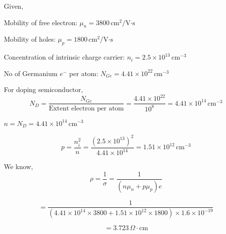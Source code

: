\documentclass[a4aper,12pt]{report}
\begin{document}
\begin{tcolorbox}[breakable, title = {\textbf{Question 1.1: }In a germanium sample, a donor type impurity is added to the extent of 1 atom per $10^8$ germanium atoms. Show that resistivity of the germanium sample drops to 3.7 ohm-cm  \\ 
    Given, 
    \begin{adjustwidth}{1cm}{5pt}
        \begin{tabular}{ll}
            $\mu_n=3800cm^2/V.s$ & \hspace*{20pt}$n_i = 2.5\times 10^{13}/cm^3$ \\
            $\mu_p = 1800cm^2/V.s$ &\hspace*{16pt} $N_{ge}=4.41 \times 10^{22}/cm^3$ 
        \end{tabular}
    \end{adjustwidth} }]
    Given,\\
    \begin{adjustwidth}{1cm}{3pt}
Mobility of free electron: $\mu_n=3800\,\text{cm}^2/\text{V·s}$ \par
Mobility of holes: $\mu_p=1800\,\text{cm}^2/\text{V·s}$ \par
Concentration of intrinsic charge carrier: $n_i=2.5\times10^{13}\,\text{cm}^{-3}$ \par
No of Germanium $e^-$ per atom: $N_{Ge}=4.41\times10^{22}\,\text{cm}^{-3}$ 
\end{adjustwidth}

For doping semiconductor,
\[
N_D=\frac{N_{Ge}}{\text{Extent electron per atom}}
=\frac{4.41\times 10^{22}}{10^{8}}
=4.41\times 10^{14}\,\text{cm}^{-3}
\]


$n=N_D=4.41\times 10^{14}\,\text{cm}^{-3}$


\[
p=\frac{n_i^2}{n}
=\frac{(2.5\times10^{13})^2}{4.41\times 10^{14}}
=1.51\times10^{12}\,\text{cm}^{-3}
\]

We know,
\[
\rho=\frac{1}{\sigma}
=\frac{1}{(n\mu_n+p\mu_p)e}
\]

\[
=\frac{1}{\left(4.41\times 10^{14}\times3800
+1.51\times 10^{12}\times1800\right)\times 1.6\times10^{-19}}
\]

\[
=3.723\,\Omega\cdot\text{cm}
\]

\end{tcolorbox}
\end{document}
